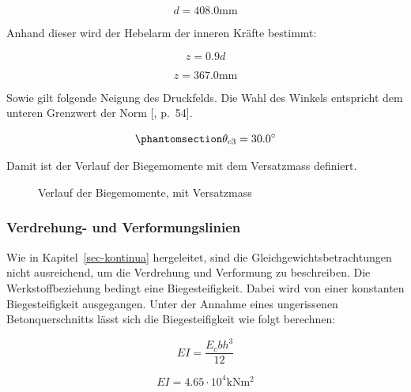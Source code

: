 \documentclass[
  12pt,
  letterpaper,
  egregdoesnotlikesansseriftitles]{scrreprt}
\begin{document}
\begin{equation}d = 408.0 \text{mm}\end{equation}

Anhand dieser wird der Hebelarm der inneren Kräfte bestimmt:

\begin{equation}z = 0.9 d\end{equation}

\begin{equation}z = 367.0 \text{mm}\end{equation}

Sowie gilt folgende Neigung des Druckfelds. Die Wahl des Winkels
entspricht dem unteren Grenzwert der Norm {[},
p.~54{]}.

\begin{equation}\phantomsection\label{eq-theta_c3_sv14}{
 \theta_{c3} = 30.0^{\circ}
}\end{equation}

Damit ist der Verlauf der Biegemomente mit dem Versatzmass definiert.

\begin{figure}[H]


\caption{\label{fig-m_x_versatz_sv14}Verlauf der Biegemomente, mit
Versatzmass}

\end{figure}%

\subsubsection{Verdrehung- und
Verformungslinien}\label{verdrehung--und-verformungslinien-1}

Wie in Kapitel~\ref{sec-kontinua} hergeleitet, sind die
Gleichgewichtsbetrachtungen nicht ausreichend, um die Verdrehung und
Verformung zu beschreiben. Die Werkstoffbeziehung bedingt eine
Biegesteifigkeit. Dabei wird von einer konstanten Biegesteifigkeit
ausgegangen. Unter der Annahme eines ungerissenen Betonquerschnitts
lässt sich die Biegesteifigkeit wie folgt berechnen:

\begin{equation}EI = \frac{E_{c} b h^{3}}{12}\end{equation}

\begin{equation}EI = 4.65 \cdot 10^{4} \text{kN} \text{m}^{2}\end{equation}
\end{document}
